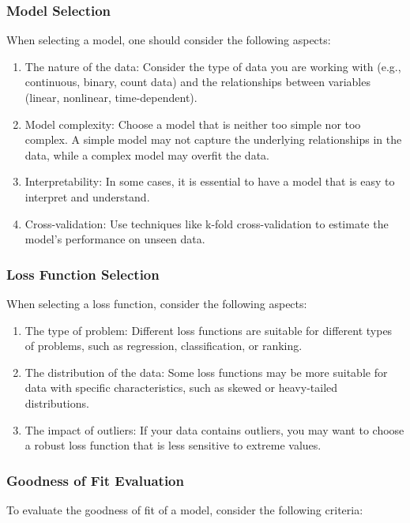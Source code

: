 \documentclass{beamer}
\begin{document}
\subsubsection{Model Selection}
When selecting a model, one should consider the following aspects:

\begin{enumerate}
\item The nature of the data: Consider the type of data you are working with (e.g., continuous, binary, count data) and the relationships between variables (linear, nonlinear, time-dependent).
\item Model complexity: Choose a model that is neither too simple nor too complex. A simple model may not capture the underlying relationships in the data, while a complex model may overfit the data.
\item Interpretability: In some cases, it is essential to have a model that is easy to interpret and understand.
\item Cross-validation: Use techniques like k-fold cross-validation to estimate the model's performance on unseen data.
\end{enumerate}

\subsubsection{Loss Function Selection}
When selecting a loss function, consider the following aspects:

\begin{enumerate}
\item The type of problem: Different loss functions are suitable for different types of problems, such as regression, classification, or ranking.
\item The distribution of the data: Some loss functions may be more suitable for data with specific characteristics, such as skewed or heavy-tailed distributions.
\item The impact of outliers: If your data contains outliers, you may want to choose a robust loss function that is less sensitive to extreme values.
\end{enumerate}

\subsubsection{Goodness of Fit Evaluation}
To evaluate the goodness of fit of a model, consider the following criteria:
\end{document}
